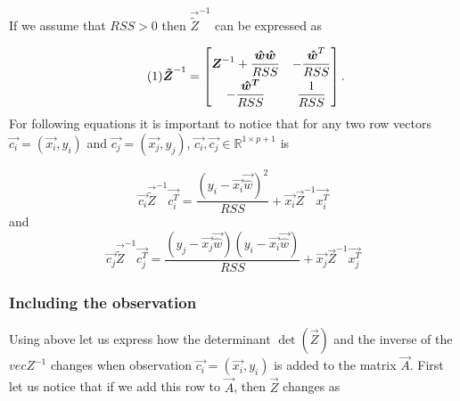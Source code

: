 If we assume that $RSS > 0$ then $\vec{\tilde{Z}}^{-1}$ can be expressed as 

\[ \numberthis
    \vec{\tilde{Z}}^{-1} = 
    \begin{bmatrix}
        \vec{Z}^{-1}+\dfrac{\vec{\hat{w}} \vec{\hat{w}}}{RSS} & - \dfrac{\vec{\hat{w}}^T}{RSS} \\[6pt]
        - \dfrac{\vec{\hat{w}^{T}}}{RSS} & \dfrac{1}{RSS}
    \end{bmatrix}.
\]
For following equations it is important to notice that for any two row vectors $\vec{c_i} = (\vec{x_i}, y_i)$  and $\vec{c_j} = (\vec{x_j}, y_j)$, $\vec{c_i}, \vec{c_j} \in \mathbb{R}^{1 \times p+1}$ is 

\begin{equation}
    \vec{c_i} \vec{\tilde{Z}}^{-1} \vec{c_i^T} = \dfrac{ ( y_i - \vec{x_i}\vec{\hat{w}} )^2 }{RSS}  + \vec{x_i}\vec{Z}^{-1}\vec{x_i^T}
\end{equation}
and
\begin{equation}
    \vec{c_j} \vec{\tilde{Z}}^{-1} \vec{c_j^T} = \dfrac{ ( y_j - \vec{x_j}\vec{\hat{w}} ) ( y_i - \vec{x_i}\vec{\hat{w}} ) }{RSS}  + \vec{x_j}\vec{Z}^{-1}\vec{x_j^T}
\end{equation}




\subsubsection*{Including the observation} 

Using above let us express how the determinant $\det(\vec{Z})$ and the inverse of the $vec{Z}^{-1}$ changes when observation $\vec{c_i} = (\vec{x_i}, y_i)$ is added to the matrix $\vec{A}$. First let us notice that if we add this row to $\vec{A}$, then  $\vec{Z}$ changes as

